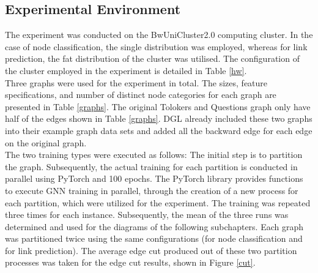 \documentclass[acmsmall,nonacm,screen,review]{acmart}
\begin{document}
\subsection{Experimental Environment}
The experiment was conducted on the BwUniCluster2.0 computing cluster. In the case of node classification, the single distribution was employed, whereas for link prediction, the fat distribution of the cluster was utilised. The configuration of the cluster employed in the experiment is detailed in Table \ref{hw}.\\
Three graphs were used for the experiment in total. The sizes, feature specifications, and number of distinct node categories for each graph are presented in Table \ref{graphs}. The original Tolokers and Questions graph only have half of the edges shown in Table \ref{graphs}. DGL already included these two graphs into their example graph data sets and added all the backward edge for each edge on the original graph.\\
The two training types were executed as follows: The initial step is to partition the graph. Subsequently, the actual training for each partition is conducted in parallel using PyTorch \cite{PyTorch} and 100 epochs. The PyTorch library provides functions to execute GNN training in parallel, through the creation of a new process for each partition, which were utilized for the experiment. The training was repeated three times for each instance. Subsequently, the mean of the three runs was determined and used for the diagrams of the following subchapters. Each graph was partitioned twice using the same configurations (for node classification and for link prediction). The average edge cut produced out of these two partition processes was taken for the edge cut results, shown in Figure \ref{cut}.
\end{document}
